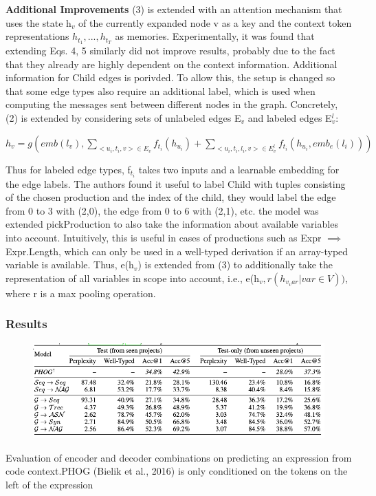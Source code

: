 \documentclass{article}
\begin{document}
\textbf{Additional Improvements} (3) is extended with an attention mechanism that uses the state h$_v$ of the currently expanded node v as a key and the context token representations $h_{t_1} , . . . , h_{t_T}$ as memories. Experimentally, it was found that extending Eqs. 4, 5 similarly did not improve results, probably due to the fact that they already are highly dependent on the context information. Additional information for Child edges is porivded. To allow this, the setup is changed so that some edge types also require an additional label, which is used when computing the messages sent between different nodes in the graph. Concretely, (2) is extended by considering sets of unlabeled edges E$_v$ and labeled edges E$_v^l$:

\begin{math}
h_v = g(emb(l_v), \sum_{<u_i,t_i,v>\in E_v} f_{t_i} (h_{u_i}) + \sum_{<u_i,t_i,l_i,v>\in E_v^l} f_{t_i} (h_{u_i},emb_e(l_i)))
\end{math}

Thus for labeled edge types, f$_{t_i}$ takes two inputs and a learnable embedding for the edge labels. The authors found it useful to label Child with tuples consisting of the chosen production and the index of the child, they would label the edge from 0 to 3 with (2,0), the edge from 0 to 6 with (2,1), etc. the model was extended pickProduction to also take the information about available variables into account. Intuitively, this is useful in cases of productions such as Expr $\implies$ Expr.Length, which can only be used in a well-typed derivation if an array-typed variable is available. Thus, e(h$_v$) is extended from (3) to additionally take the representation of all variables in scope into account, i.e., e(h$_v,r({h_{v_var} | var \in V}))$, where r is a max pooling operation.
\subsubsection{Results}
\begin{figure}[ht]
\vskip 0.2in
\begin{center}
\centerline{\includegraphics[width=\columnwidth]{Images/Synthesis2-3.png}}
\label{icml-historical}
\end{center}
\vskip -0.2in
\end{figure}
Evaluation of encoder and decoder combinations on predicting an expression from code context.PHOG (Bielik et al., 2016) is only conditioned on the tokens on the left of the expression
\end{document}

